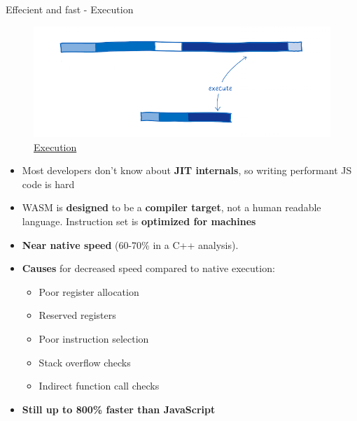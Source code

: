 \documentclass{beamer}
\begin{document}
\begin{frame}{Effecient and fast - Execution}
    \begin{figure}
        \includegraphics[scale=0.1]{./images/execution.png}
        \caption{\href{https://www.smashingmagazine.com/2017/05/abridged-cartoon-introduction-webassembly/}{Execution}}
    \end{figure}
    \begin{itemize}
        \item Most developers don't know about \textbf{JIT internals}, so writing performant JS code is hard
        \item WASM is \textbf{designed} to be a \textbf{compiler target}, not a human readable language. Instruction set is \textbf{optimized for machines}
        \item \textbf{Near native speed} (60-70\% in a C++ analysis). 
        \item \textbf{Causes} for decreased speed compared to native execution:
        \begin{itemize}
            \item Poor register allocation
            \item Reserved registers
            \item Poor instruction selection
            \item Stack overflow checks
            \item Indirect function call checks
        \end{itemize}
        \item \textbf{Still up to 800\% faster than JavaScript}
    \end{itemize}
\end{frame}
\end{document}
